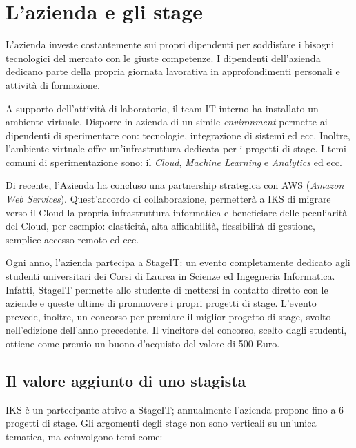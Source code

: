 
\chapter{L'azienda e gli stage}
\label{cap:stage}
\vspace{20pt}

L'azienda investe costantemente sui propri dipendenti per soddisfare 
i bisogni tecnologici del mercato con le giuste competenze. 
I dipendenti dell'azienda dedicano parte della propria giornata lavorativa 
in approfondimenti personali e attività di formazione. 

A supporto dell'attività di laboratorio, il team IT interno ha installato 
un ambiente virtuale. Disporre in azienda di un simile \emph{environment} permette 
ai dipendenti di sperimentare con: tecnologie, integrazione di sistemi ed ecc. 
Inoltre, l'ambiente virtuale offre un'infrastruttura dedicata per i 
progetti di stage. I temi comuni di sperimentazione sono: il  \textit{Cloud}, 
\textit{Machine Learning} e \textit{Analytics} ed ecc. 

Di recente, l'Azienda ha concluso una partnership strategica con AWS 
(\textit{Amazon Web Services}). Quest'accordo di collaborazione, 
permetterà a IKS di migrare verso il Cloud la propria infrastruttura 
informatica e beneficiare delle peculiarità del Cloud, per esempio: elasticità, 
alta affidabilità, flessibilità di gestione, semplice accesso remoto ed ecc. 

Ogni anno, l'azienda partecipa a StageIT: un evento completamente dedicato 
agli studenti universitari dei Corsi di Laurea in Scienze ed Ingegneria 
Informatica.
Infatti, StageIT permette  allo studente di mettersi in contatto diretto 
con le aziende e queste ultime di promuovere i propri progetti di stage. 
L'evento prevede, inoltre, un concorso per premiare il miglior progetto 
di stage, svolto nell'edizione dell'anno precedente. Il vincitore del concorso, 
scelto dagli studenti, ottiene come premio un buono d'acquisto del 
valore di 500 Euro.

\section{Il valore aggiunto di uno stagista}

IKS è un partecipante attivo a StageIT; annualmente l'azienda propone 
fino a 6 progetti di stage. Gli argomenti degli stage non sono verticali 
su un'unica tematica, ma coinvolgono temi come: 


